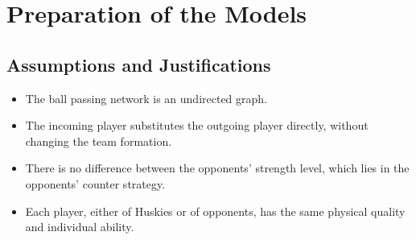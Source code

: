 \documentclass[12pt]{article}  %
\begin{document}





\section{Preparation of the Models}
\subsection{Assumptions and Justifications}
\begin{itemize}
    \setlength{\parsep}{0ex} %
    \setlength{\topsep}{2ex} %
    \setlength{\itemsep}{1ex} %
    \item The ball passing network is an undirected graph.
    \item The incoming player substitutes the outgoing player directly, without changing the team formation. 
    \item There is no difference between the opponents' strength level, which lies in the opponents' counter strategy. 
    \item Each player, either of Huskies or of opponents, has the same physical quality and individual ability.  
\end{itemize}
\end{document}

